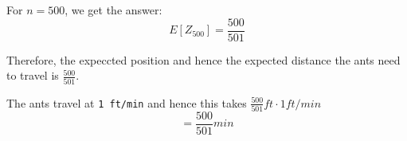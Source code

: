 \documentclass[10pt]{article}
\begin{document}
For \( n = 500 \), we get the answer:
\[ E[Z_{500}] = \frac{500}{501} \]

Therefore, the expeccted position and hence the expected distance the ants need to travel is \( \frac{500}{501} \).

The ants travel at \texttt{1 ft/min} and hence this takes \( \frac{500}{501} ft \cdot 1 ft/min \)
\[ = \frac{500}{501} min \]
\end{document}
